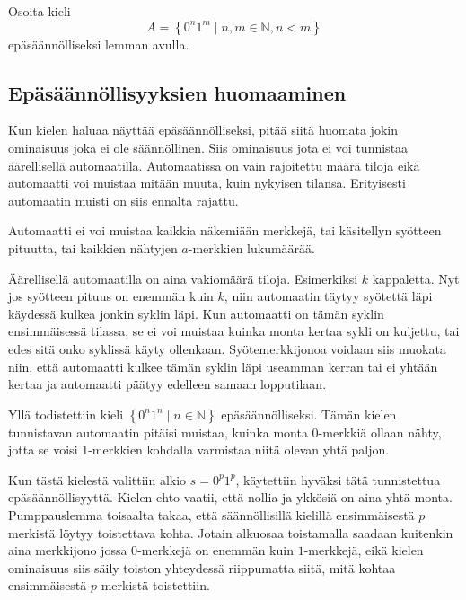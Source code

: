 \documentclass[a4paper,11pt]{article}
\theoremstyle{definition}
\newcommand{\set}[1]{{\left\{ #1 \right\}}}
\newcommand{\Nat}{\mathbb{N}}
\begin{document}
\begin{exercise}
  Osoita kieli
  \begin{equation*}
        A = \set{0^n1^m \mid n,m \in \Nat, n < m}
  \end{equation*}
  epä\-sään\-nöl\-li\-sek\-si lemman avulla.
\end{exercise}

\subsection*{Epäsäännöllisyyksien huomaaminen}

Kun kielen haluaa näyttää epäsäännölliseksi, pitää siitä huomata jokin
ominaisuus joka ei ole säännöllinen. Siis ominaisuus jota ei voi tunnistaa
äärellisellä automaatilla. Automaatissa on vain rajoitettu määrä tiloja eikä
automaatti voi muistaa mitään muuta, kuin nykyisen tilansa. Erityisesti
automaatin muisti on siis ennalta rajattu.

Automaatti ei voi muistaa kaikkia näkemiään merkkejä, tai käsitellyn syötteen
pituutta, tai kaikkien nähtyjen $a$-merkkien lukumäärää.

Äärellisellä automaatilla on aina vakiomäärä tiloja. Esimerkiksi $k$
kappaletta. Nyt jos syötteen pituus on enemmän kuin $k$, niin automaatin täytyy
syötettä läpi käydessä kulkea jonkin syklin läpi. Kun automaatti on tämän
syklin ensimmäisessä tilassa, se ei voi muistaa kuinka monta kertaa sykli on
kuljettu, tai edes sitä onko syklissä käyty ollenkaan. Syötemerkkijonoa voidaan
siis muokata niin, että automaatti kulkee tämän syklin läpi useamman kerran tai
ei yhtään kertaa ja automaatti päätyy edelleen samaan lopputilaan.

Yllä todistettiin kieli $\set{0^n1^n \mid n \in \Nat}$ epäsäännölliseksi. Tä\-män
kielen tunnistavan automaatin pitäisi muistaa, kuinka monta $0$-merkkiä ollaan
nähty, jotta se voisi $1$-merkkien kohdalla varmistaa niitä olevan yhtä paljon.

Kun tästä kielestä valittiin alkio $s = 0^p1^p$, käytettiin hy\-väk\-si tätä
tunnistettua epäsäännöllisyyttä. Kielen ehto vaatii, että nollia ja ykkösiä on
aina yhtä monta. Pumppauslemma toisaalta takaa, että säännöllisillä kielillä
ensimmäisestä $p$ merkistä löytyy toistettava kohta. Jotain alkuosaa
toistamalla saadaan kuitenkin aina merkkijono jossa $0$-merkkejä on enemmän
kuin $1$-merkkejä, eikä kielen ominaisuus siis säily toiston yhteydessä
riippumatta siitä, mitä kohtaa ensimmäisestä $p$ merkistä toistettiin.
\end{document}
